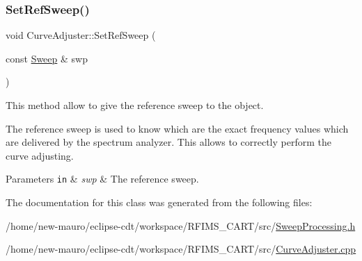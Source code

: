 \subsubsection{\texorpdfstring{Set\+Ref\+Sweep()}{SetRefSweep()}}
{\footnotesize\ttfamily void Curve\+Adjuster\+::\+Set\+Ref\+Sweep (\begin{DoxyParamCaption}\item[{const \hyperlink{structSweep}{Sweep} \&}]{swp }\end{DoxyParamCaption})\hspace{0.3cm}{\ttfamily [inline]}}



This method allow to give the reference sweep to the object. 

The reference sweep is used to know which are the exact frequency values which are delivered by the spectrum analyzer. This allows to correctly perform the curve adjusting. 
\begin{DoxyParams}[1]{Parameters}
\mbox{\tt in}  & {\em swp} & The reference sweep. \\
\hline
\end{DoxyParams}


The documentation for this class was generated from the following files\+:\begin{DoxyCompactItemize}
\item 
/home/new-\/mauro/eclipse-\/cdt/workspace/\+R\+F\+I\+M\+S\+\_\+\+C\+A\+R\+T/src/\hyperlink{SweepProcessing_8h}{Sweep\+Processing.\+h}\item 
/home/new-\/mauro/eclipse-\/cdt/workspace/\+R\+F\+I\+M\+S\+\_\+\+C\+A\+R\+T/src/\hyperlink{CurveAdjuster_8cpp}{Curve\+Adjuster.\+cpp}\end{DoxyCompactItemize}
